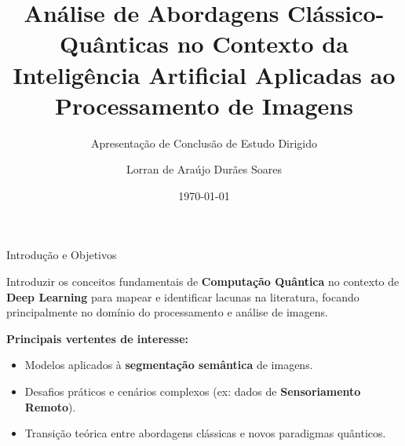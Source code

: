 \documentclass[aspectratio=169, 11pt]{beamer}
\title[Estudo Dirigido: Clássico-Quântico]{Análise de Abordagens Clássico-Quânticas no Contexto da Inteligência Artificial Aplicadas ao Processamento de Imagens}
\subtitle{Apresentação de Conclusão de Estudo Dirigido}
\author[Lorran de A. D. Soares]{Lorran de Araújo Durães Soares}
\institute[LNCC]{Laboratório Nacional de Computação Científica --- LNCC}
\date{\today}
\begin{document}
\begin{frame}[plain]
    \titlepage
\end{frame}

\begin{frame}{Introdução e Objetivos}
    \begin{tcolorbox}[colback=accentbg, colframe=darkblue, title=Objetivo Principal]
        Introduzir os conceitos fundamentais de \textbf{Computação Quântica} no contexto de \textbf{Deep Learning} para mapear e identificar lacunas na literatura, focando principalmente no domínio do processamento e análise de imagens.
    \end{tcolorbox}
    
    \vspace{0.3cm}
    \textbf{Principais vertentes de interesse:}
    \begin{itemize}
        \item Modelos aplicados à \textbf{segmentação semântica} de imagens.
        \item Desafios práticos e cenários complexos (ex: dados de \textbf{Sensoriamento Remoto}).
        \item Transição teórica entre abordagens clássicas e novos paradigmas quânticos.
    \end{itemize}
\end{frame}
\end{document}
